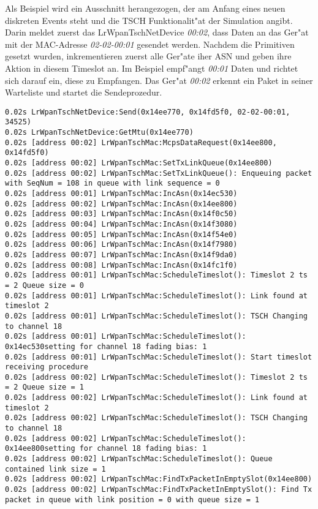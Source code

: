 Als Beispiel wird ein Ausschnitt herangezogen, der am Anfang eines neuen diskreten
Events steht und die TSCH Funktionalit"at der Simulation angibt.
Darin meldet zuerst das LrWpanTschNetDevice \textit{00:02}, dass Daten an das Ger"at
mit der MAC-Adresse \textit{02-02-00:01} gesendet werden. Nachdem die Primitiven
gesetzt wurden, inkrementieren zuerst alle Ger"ate iher ASN und geben ihre
Aktion in diesem Timeslot an. Im Beispiel empf"angt \textit{00:01} Daten und
richtet sich darauf ein, diese zu Empfangen. Das Ger"at \textit{00:02} erkennt ein
Paket in seiner Warteliste und startet die Sendeprozedur.

\begin{lstlisting}[frame=single]
0.02s LrWpanTschNetDevice:Send(0x14ee770, 0x14fd5f0, 02-02-00:01, 34525)
0.02s LrWpanTschNetDevice:GetMtu(0x14ee770)
0.02s [address 00:02] LrWpanTschMac:McpsDataRequest(0x14ee800, 0x14fd5f0)
0.02s [address 00:02] LrWpanTschMac:SetTxLinkQueue(0x14ee800)
0.02s [address 00:02] LrWpanTschMac:SetTxLinkQueue(): Enqueuing packet with SeqNum = 108 in queue with link sequence = 0
0.02s [address 00:01] LrWpanTschMac:IncAsn(0x14ec530)
0.02s [address 00:02] LrWpanTschMac:IncAsn(0x14ee800)
0.02s [address 00:03] LrWpanTschMac:IncAsn(0x14f0c50)
0.02s [address 00:04] LrWpanTschMac:IncAsn(0x14f3080)
0.02s [address 00:05] LrWpanTschMac:IncAsn(0x14f54e0)
0.02s [address 00:06] LrWpanTschMac:IncAsn(0x14f7980)
0.02s [address 00:07] LrWpanTschMac:IncAsn(0x14f9da0)
0.02s [address 00:08] LrWpanTschMac:IncAsn(0x14fc1f0)
0.02s [address 00:01] LrWpanTschMac:ScheduleTimeslot(): Timeslot 2 ts = 2 Queue size = 0
0.02s [address 00:01] LrWpanTschMac:ScheduleTimeslot(): Link found at timeslot 2
0.02s [address 00:01] LrWpanTschMac:ScheduleTimeslot(): TSCH Changing to channel 18
0.02s [address 00:01] LrWpanTschMac:ScheduleTimeslot(): 0x14ec530setting for channel 18 fading bias: 1
0.02s [address 00:01] LrWpanTschMac:ScheduleTimeslot(): Start timeslot receiving procedure
0.02s [address 00:02] LrWpanTschMac:ScheduleTimeslot(): Timeslot 2 ts = 2 Queue size = 1
0.02s [address 00:02] LrWpanTschMac:ScheduleTimeslot(): Link found at timeslot 2
0.02s [address 00:02] LrWpanTschMac:ScheduleTimeslot(): TSCH Changing to channel 18
0.02s [address 00:02] LrWpanTschMac:ScheduleTimeslot(): 0x14ee800setting for channel 18 fading bias: 1
0.02s [address 00:02] LrWpanTschMac:ScheduleTimeslot(): Queue contained link size = 1
0.02s [address 00:02] LrWpanTschMac:FindTxPacketInEmptySlot(0x14ee800)
0.02s [address 00:02] LrWpanTschMac:FindTxPacketInEmptySlot(): Find Tx packet in queue with link position = 0 with queue size = 1

\end{lstlisting}
